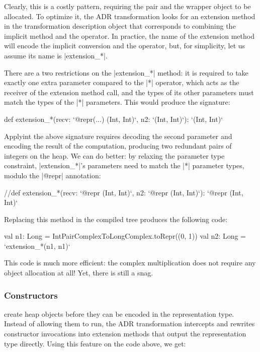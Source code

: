 Clearly, this is a costly pattern, requiring the pair and the wrapper object to be allocated. To optimize it, the ADR transformation looks for an extension method in the transformation description object that corresponds to combining the implicit method and the operator. In practice, the name of the extension method will encode the implicit conversion and the operator, but, for simplicity, let us assume its name is |extension_*|.

There are a two restrictions on the |extension_*| method: it is required to take exactly one extra parameter compared to the |*| operator, which acts as the receiver of the extension method call, and the types of its other parameters must match the types of the |*| parameters. This would produce the signature:

\begin{lstlisting-nobreak}
def extension_*(recv: `@repr(...) (Int, Int)`, n2: `(Int, Int)`): `(Int, Int)`
\end{lstlisting-nobreak}

Applyint the above signature requires decoding the second parameter and encoding the result of the computation, producing two redundant pairs of integers on the heap. We can do better: by relaxing the parameter type constraint, |extension_*|'s parameters need to match the |*| parameter types, modulo the |@repr| annotation: %

\begin{lstlisting-nobreak}
//def extension_*(recv: `@repr (Int, Int)`,  n2: `@repr (Int, Int)`): `@repr (Int, Int)`
\end{lstlisting-nobreak}

Replacing this method in the compiled tree produces the following code:

\begin{lstlisting-nobreak}
val n1: Long = IntPairComplexToLongComplex.toRepr((0, 1))
val n2: Long = `extension_*(n1, n1)`
\end{lstlisting-nobreak}

This code is much more efficient: the complex multiplication does not require any object allocation at all! Yet, there is still a snag.

\subsubsection{Constructors} create heap objects before they can be encoded in the representation type. Instead of allowing them to run, the ADR transformation intercepts and rewrites constructor invocations into extension methods that output the representation type directly. Using this feature on the code above, we get:

